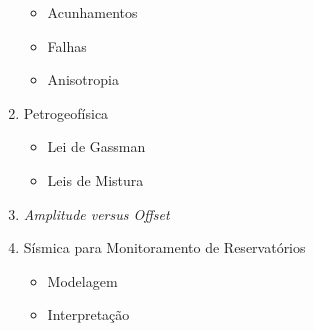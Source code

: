 \documentclass[a4paper,11pt]{scrartcl}
\begin{document}
\begin{enumerate}
\begin{itemize}
	\item Acunhamentos
	\item Falhas
	\item Anisotropia
	\end{itemize}
\item Petrogeof\'isica
	\begin{itemize}
	\item Lei de Gassman
	\item Leis de Mistura
	\end{itemize}	
\item \emph{Amplitude versus Offset}
\item S\'ismica para Monitoramento de Reservat\'orios
	\begin{itemize}
	\item Modelagem
	\item Interpreta\c{c}\~ao
	\end{itemize}
\end{enumerate}
\end{document}
